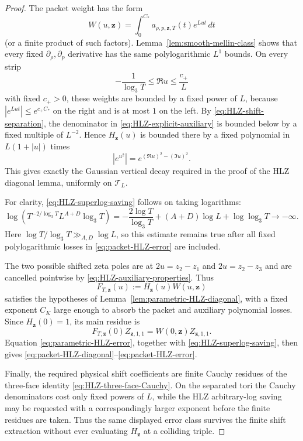 \begin{proof}
The packet weight has the form
\[
W(u,\mathbf z)=\int_0^{C_*}a_{\rho,p,\mathbf z,T}(t)e^{Lut}\,dt
\]
(or a finite product of such factors). Lemma~\ref{lem:smooth-mellin-class}
shows that every fixed $\partial_\rho,\partial_p$ derivative has the same
polylogarithmic $L^1$ bounds. On every strip
\[
-\frac1{\log_3T}\le\Re u\le\frac{c_+}{L}
\]
with fixed $c_+>0$, these weights are bounded by a fixed power of $L$, because
$|e^{Lut}|\le e^{c_+C_*}$ on the right and is at most $1$ on the left.  By
\eqref{eq:HLZ-shift-separation}, the denominator in
\eqref{eq:HLZ-explicit-auxiliary} is bounded below by a fixed multiple of
$L^{-2}$.  Hence $H_{\mathbf z}(u)$ is bounded there by a fixed polynomial in
$L(1+|u|)$ times
\[
|e^{u^2}|=e^{(\Re u)^2-(\Im u)^2}.
\]
This gives exactly the Gaussian vertical decay required in the proof of the
HLZ diagonal lemma, uniformly on $\mathcal T_L$.

For clarity, \eqref{eq:HLZ-superlog-saving} follows on taking logarithms:
\[
\log\!\left(T^{-2/\log_3T}L^{A+D}\log_3T\right)
=-\frac{2\log T}{\log_3T}+(A+D)\log L+\log\log_3T\longrightarrow-\infty.
\]
Here $\log T/\log_3T\gg_{A,D}\log L$, so this estimate remains true after all
fixed polylogarithmic losses in \eqref{eq:packet-HLZ-error} are included.

The two possible shifted zeta poles are at
$2u=z_2-z_1$ and $2u=z_2-z_3$ and are cancelled pointwise by
\eqref{eq:HLZ-auxiliary-properties}.  Thus
\[
F_{T,\mathbf z}(u):=H_{\mathbf z}(u)W(u,\mathbf z)
\]
satisfies the hypotheses of Lemma~\ref{lem:parametric-HLZ-diagonal}, with a
fixed exponent $C_K$ large enough to absorb the packet and auxiliary polynomial
losses. Since $H_{\mathbf z}(0)=1$, its main residue is
\[
F_{T,\mathbf z}(0)Z_{\mathbf z,1,1}
=W(0,\mathbf z)Z_{\mathbf z,1,1}.
\]
Equation \eqref{eq:parametric-HLZ-error}, together with
\eqref{eq:HLZ-superlog-saving}, then gives
\eqref{eq:packet-HLZ-diagonal}--\eqref{eq:packet-HLZ-error}.

Finally, the required physical shift coefficients are finite Cauchy residues
of the three-face identity \eqref{eq:HLZ-three-face-Cauchy}.  On the separated
tori the Cauchy denominators cost only fixed powers of $L$, while the HLZ
arbitrary-log saving may be requested with a correspondingly larger exponent
before the finite residues are taken.  Thus the same displayed error class
survives the finite shift extraction without ever evaluating
$H_{\mathbf z}$ at a colliding triple.
\end{proof}

